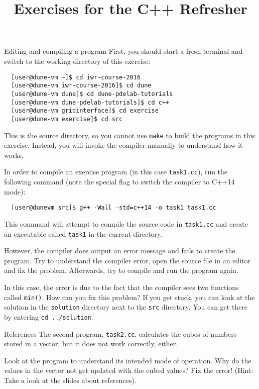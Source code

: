 \documentclass[12pt,a4paper]{article}
\title{\textbf{Exercises for the C++ Refresher}}
\begin{document}
\exerciseheader

\begin{Exercise}{Editing and compiling a program}
First, you should start a fresh terminal and switch to the working directory of this exercise:
\begin{lstlisting}
  [user@dune-vm ~]$ cd iwr-course-2016
  [user@dune-vm iwr-course-2016]$ cd dune
  [user@dune-vm dune]$ cd dune-pdelab-tutorials
  [user@dune-vm dune-pdelab-tutorials]$ cd c++
  [user@dune-vm gridinterface]$ cd exercise
  [user@dune-vm exercise]$ cd src
\end{lstlisting}

This is the source directory, so you cannot use \lstinline!make! to build the programs in this exercise.
Instead, you will invoke the compiler manually to understand how it works.

In order to compile an exercise program (in this case \lstinline!task1.cc!), run the following command (note
the special flag to switch the compiler to C++14 mode):

\begin{lstlisting}
  [user@dunevm src]$ g++ -Wall -std=c++14 -o task1 task1.cc
\end{lstlisting}

This command will attempt to compile the source code in \lstinline!task1.cc! and create an executable called \lstinline!task1! in the current directory.

However, the compiler does output an error message and fails to create the program. Try to understand the compiler error, open the source file in an editor and fix the problem. Afterwards, try to compile and run the program again.

In this case, the error is due to the fact that the compiler sees two functions called \texttt{min()}. How
can you fix this problem? If you get stuck, you can look at the solution in the \lstinline!solution! directory next to the \lstinline!src! directory. You can get there by entering \lstinline!cd ../solution!.

\end{Exercise}

\begin{Exercise}{References}
The second program, \lstinline!task2.cc!, calculates the cubes of numbers stored in a vector, but it does not
work correctly, either.

Look at the program to understand its intended mode of operation. Why do the values in the vector not get
updated with the cubed values? Fix the error! (Hint: Take a look at the slides about references).

\end{Exercise}
\end{document}
